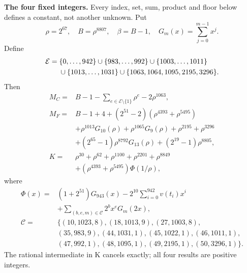 \documentclass[11pt]{article}
\theoremstyle{remark}\newtheorem{remark}[theorem]{Remark}
\begin{document}
\textbf{The four fixed integers.}
Every index, set, sum, product and floor below defines a constant, not
another unknown. Put
\[
\rho=2^{67},\quad B=\rho^{8807},\quad\beta=B-1,\quad
G_m(x)=\sum_{j=0}^{m-1}x^j.
\]
Define
\[
\begin{split}
\mathcal E={}&\{0,\ldots,942\}\cup\{983,\ldots,992\}\cup\{1003,\ldots,1011\}\\
&\cup\{1013,\ldots,1031\}\cup\{1063,1064,1095,2195,3296\}.
\end{split}
\]
Then
\begin{align*}
M_C={}&B-1-\sum_{e\in\mathcal E\setminus\{1\}}\rho^e-2\rho^{1063},\\
M_F={}&B-1+4+(2^{51}-2)(\rho^{4393}+\rho^{5495})\\
&+\rho^{1013}G_{10}(\rho)+\rho^{1065}G_9(\rho)
  +\rho^{2195}+\rho^{3296}\\
&+(2^{65}-1)\rho^{8792}G_{13}(\rho)+(2^{19}-1)\rho^{8805},\\
K={}&\rho^{30}+\rho^{62}+\rho^{1100}+\rho^{2201}+\rho^{8849}\\
&+(\rho^{4393}+\rho^{5495})\Phi(1/\rho),
\end{align*}
where
\[
\begin{split}
\Phi(x)={}&(1+2^{51})G_{943}(x)
 -2^{10}\sum_{i=0}^{942}v(t_i)x^i\\
&+\sum_{(b,e,m)\in\mathcal C}2^b x^e G_m(2x),\\
\mathcal C={}&\{(10,1023,8),(18,1013,9),(27,1003,8),\\
&(35,983,9),(44,1031,1),(45,1022,1),(46,1011,1),\\
&(47,992,1),(48,1095,1),(49,2195,1),(50,3296,1)\}.
\end{split}
\]
The rational intermediate in K cancels exactly; all four results are positive integers.
\end{document}
